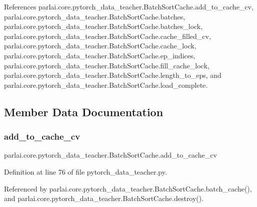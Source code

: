 References parlai.\+core.\+pytorch\+\_\+data\+\_\+teacher.\+Batch\+Sort\+Cache.\+add\+\_\+to\+\_\+cache\+\_\+cv, parlai.\+core.\+pytorch\+\_\+data\+\_\+teacher.\+Batch\+Sort\+Cache.\+batches, parlai.\+core.\+pytorch\+\_\+data\+\_\+teacher.\+Batch\+Sort\+Cache.\+batches\+\_\+lock, parlai.\+core.\+pytorch\+\_\+data\+\_\+teacher.\+Batch\+Sort\+Cache.\+cache\+\_\+filled\+\_\+cv, parlai.\+core.\+pytorch\+\_\+data\+\_\+teacher.\+Batch\+Sort\+Cache.\+cache\+\_\+lock, parlai.\+core.\+pytorch\+\_\+data\+\_\+teacher.\+Batch\+Sort\+Cache.\+ep\+\_\+indices, parlai.\+core.\+pytorch\+\_\+data\+\_\+teacher.\+Batch\+Sort\+Cache.\+fill\+\_\+cache\+\_\+lock, parlai.\+core.\+pytorch\+\_\+data\+\_\+teacher.\+Batch\+Sort\+Cache.\+length\+\_\+to\+\_\+eps, and parlai.\+core.\+pytorch\+\_\+data\+\_\+teacher.\+Batch\+Sort\+Cache.\+load\+\_\+complete.



\subsection{Member Data Documentation}
\mbox{\label{classparlai_1_1core_1_1pytorch__data__teacher_1_1BatchSortCache_aee6ea11fd9febb0d4178127cffd63561}} 
\subsubsection{\texorpdfstring{add\+\_\+to\+\_\+cache\+\_\+cv}{add\_to\_cache\_cv}}
{\footnotesize\ttfamily parlai.\+core.\+pytorch\+\_\+data\+\_\+teacher.\+Batch\+Sort\+Cache.\+add\+\_\+to\+\_\+cache\+\_\+cv}



Definition at line 76 of file pytorch\+\_\+data\+\_\+teacher.\+py.



Referenced by parlai.\+core.\+pytorch\+\_\+data\+\_\+teacher.\+Batch\+Sort\+Cache.\+batch\+\_\+cache(), and parlai.\+core.\+pytorch\+\_\+data\+\_\+teacher.\+Batch\+Sort\+Cache.\+destroy().

